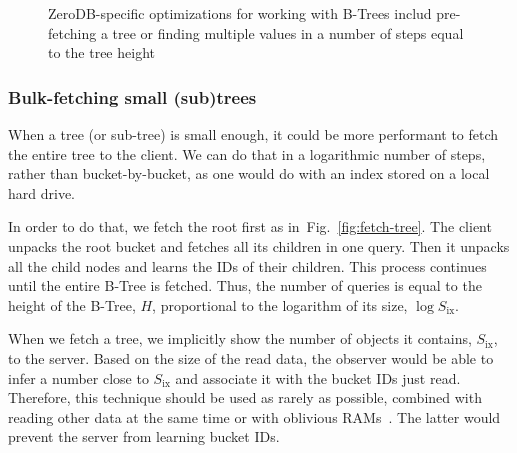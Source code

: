 \documentclass[notitlepage,longbibliography]{revtex4-1}
\newcommand{\figref}[1]{Fig.~\ref{#1}}
\begin{document}
\begin{figure}
	\begin{center}
        \qquad
	\end{center}
    \caption{ZeroDB-specific optimizations for working with B-Trees includ pre-fetching a tree or finding multiple values in a number of steps equal to the tree height}
	\label{fig:tree-traversal-optimizations}
\end{figure}

\subsubsection{Bulk-fetching small (sub)trees}
\label{sec:bulk-fetching}

When a tree (or sub-tree) is small enough, it could be more performant to fetch the entire tree to the client.
We can do that in a logarithmic number of steps, rather than bucket-by-bucket, as one would do with an index stored on a local hard drive.

In order to do that, we fetch the root first as in~\figref{fig:fetch-tree}.
The client unpacks the root bucket and fetches all its children in one query.
Then it unpacks all the child nodes and learns the IDs of their children.
This process continues until the entire B-Tree is fetched.
Thus, the number of queries is equal to the height of the B-Tree, $H$, proportional to the logarithm of its size, $\log{S_{\mbox{ix}}}$.

When we fetch a tree, we implicitly show the number of objects it contains, $S_{\mbox{ix}}$, to the server.
Based on the size of the read data, the observer would be able to infer a number close to $S_{\mbox{ix}}$ and associate it with the bucket IDs just read.
Therefore, this technique should be used as rarely as possible, combined with reading other data at the same time or with oblivious RAMs~\cite{path-oram,burst-oram,oram-multicloud,ods-wang-2014}.
The latter would prevent the server from learning bucket IDs.
\end{document}

